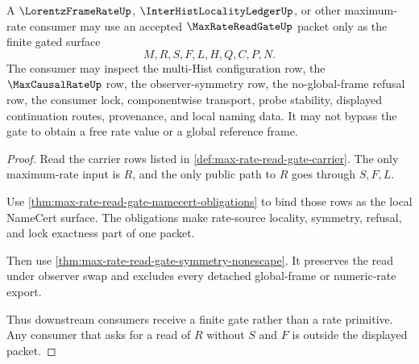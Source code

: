 \begin{theorem}
\label{thm:max-rate-read-gate-downstream-consumer-boundary}
A $\LorentzFrameRateUp$, $\InterHistLocalityLedgerUp$, or other maximum-rate consumer may use an accepted $\MaxRateReadGateUp$ packet only as the finite gated surface
$$
M,R,S,F,L,H,Q,C,P,N.
$$
The consumer may inspect the multi-Hist configuration row, the $\MaxCausalRateUp$ row, the observer-symmetry row, the no-global-frame refusal row, the consumer lock, componentwise transport, probe stability, displayed continuation routes, provenance, and local naming data. It may not bypass the gate to obtain a free rate value or a global reference frame.
\end{theorem}
\begin{proof}
Read the carrier rows listed in \autoref{def:max-rate-read-gate-carrier}. The only maximum-rate input is $R$, and the only public path to $R$ goes through $S,F,L$.

Use \autoref{thm:max-rate-read-gate-namecert-obligations} to bind those rows as the local NameCert surface. The obligations make rate-source locality, symmetry, refusal, and lock exactness part of one packet.

Then use \autoref{thm:max-rate-read-gate-symmetry-nonescape}. It preserves the read under observer swap and excludes every detached global-frame or numeric-rate export.

Thus downstream consumers receive a finite gate rather than a rate primitive. Any consumer that asks for a read of $R$ without $S$ and $F$ is outside the displayed packet.
\end{proof}

